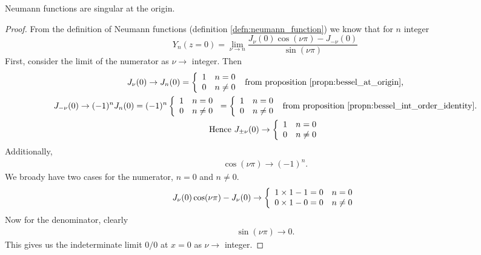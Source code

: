 \begin{propn}\label{propn:neumann_singular_at_origin}
  Neumann functions are singular at the origin.
\end{propn}
%
\begin{proof}
  From the definition of Neumann functions (definition \ref{defn:neumann_function}) we know that for $n$ integer
    \begin{equation}
      Y_n(z=0) = \lim_{\nu \rightarrow n} \frac{J_\nu(0) \cos (\nu \pi) - J_{-\nu}(0)}{\sin (\nu \pi)}
    \end{equation}
  First, consider the limit of the numerator as $\nu \rightarrow$ integer. Then
    \begin{gather*}
      J_\nu(0) \rightarrow
        J_n(0) = \left\{
          \begin{array}{c l}
               1 & n = 0 \\
               0 & n \neq 0
          \end{array}\right. \text{ from proposition \ref{propn:bessel_at_origin},}\\
      J_{-\nu}(0) \rightarrow
        (-1)^nJ_n(0) = (-1)^n\left\{
          \begin{array}{c l}
               1 & n = 0 \\
               0 & n \neq 0
          \end{array}\right.
          = \left\{
            \begin{array}{c l}
                 1 & n = 0 \\
                 0 & n \neq 0
            \end{array}\right. \text{ from proposition \ref{propn:bessel_int_order_identity}.}\\
      \text{Hence } J_{\pm\nu}(0) \rightarrow
        \left\{
          \begin{array}{c l}
               1 & n = 0 \\
               0 & n \neq 0
          \end{array}\right.
    \end{gather*}
  Additionally,
    \begin{gather*}
      \cos(\nu\pi) \rightarrow (-1)^n.
    \end{gather*}
  We broady have two cases for the numerator, $n=0$ and $n\neq 0$.
    \begin{gather*}
      J_\nu(0)\cos(\nu\pi) - J_\nu(0) \rightarrow
      \left\{
        \begin{array}{c l}
             1\times1-1=0 & n = 0 \\
             0\times1-0=0 & n \neq 0
        \end{array}\right.
    \end{gather*}
  Now for the denominator, clearly
    \begin{gather*}
      \sin(\nu\pi) \rightarrow 0.
    \end{gather*}
  This gives us the indeterminate limit $0/0$ at $x=0$ as $\nu \rightarrow$ integer.
\end{proof}
